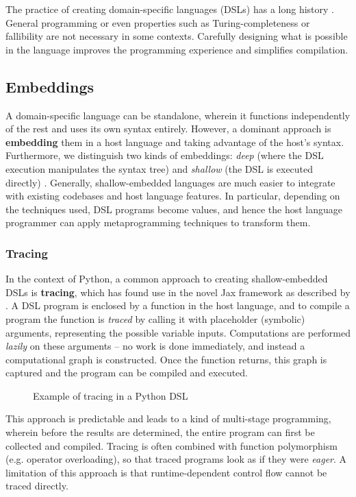 The practice of creating domain-specific languages (DSLs) has a long history \cite{hudak1996building}. General programming or even properties such as Turing-completeness or fallibility are not necessary in some contexts. Carefully designing what is possible in the language improves the programming experience and simplifies compilation. 

\subsection{Embeddings}

A domain-specific language can be standalone, wherein it functions independently of the rest and uses its own syntax entirely. However, a dominant approach is \textbf{embedding} them in a host language and taking advantage of the host's syntax. Furthermore, we distinguish two kinds of embeddings: \textit{deep} (where the DSL execution manipulates the syntax tree) and \textit{shallow} (the DSL is executed directly) \cite{gibbons2014folding}. Generally, shallow-embedded languages are much easier to integrate with existing codebases and host language features. In particular, depending on the techniques used, DSL programs become values, and hence the host language programmer can apply metaprogramming techniques to transform them.

\subsubsection{Tracing}

In the context of Python, a common approach to creating shallow-embedded DSLs is \textbf{tracing}, which has found use in the novel Jax framework as described by \textcite{frostig2018compiling}. A DSL program is enclosed by a function in the host language, and to compile a program the function is \textit{traced} by calling it with placeholder (symbolic) arguments, representing the possible variable inputs. Computations are performed \textit{lazily} on these arguments -- no work is done immediately, and instead a computational graph is constructed. Once the function returns, this graph is captured and the program can be compiled and executed.
\begin{figure}[ht]
    \caption{Example of tracing in a Python DSL}
    \label{fig:tracing}
\end{figure}
This approach is predictable and leads to a kind of multi-stage programming, wherein before the results are determined, the entire program can first be collected and compiled. Tracing is often combined with function polymorphism (e.g. operator overloading), so that traced programs look as if they were \textit{eager}. A limitation of this approach is that runtime-dependent control flow cannot be traced directly.

